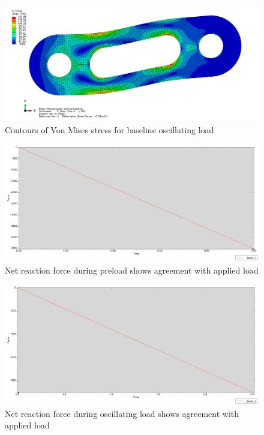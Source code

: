 \documentclass[../main.tex]{subfiles}
\begin{document}
\begin{figure}[H]
    \centering
    \includegraphics[scale=0.2]{../../images/baseline_vertical_mises.png}
    \caption{Contours of Von Mises stress for baseline oscillating load}
    \label{baseline_vertical_mises}
\end{figure}

\begin{figure}[H]
    \centering
    \includegraphics[scale=0.15]{../../images/RF_preload.png}
    \caption{Net reaction force during preload shows agreement with applied load}
    \label{RF_preload}
\end{figure}

\begin{figure}[H]
    \centering
    \includegraphics[scale=0.15]{../../images/RF_vertical.png}
    \caption{Net reaction force during oscillating load shows agreement with applied load}
    \label{RF_oscillating}
\end{figure}
\end{document}
